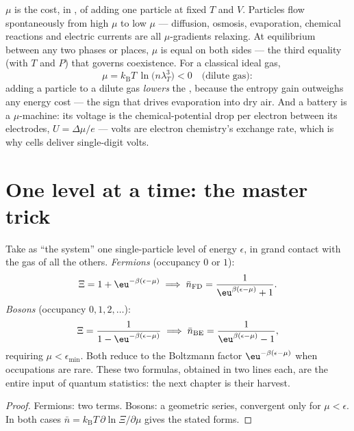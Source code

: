 \begin{definition}\label{def:b3:grand-canonical:mu}
$\mu$ is the cost, in , of adding one particle at fixed
$T$ and $V$. Particles flow spontaneously from high $\mu$ to low
$\mu$ --- diffusion, osmosis, evaporation, chemical reactions and
electric currents are all $\mu$-gradients relaxing. At equilibrium
between any two phases or places, $\mu$ is equal on both sides ---
the third equality (with $T$ and $P$) that governs coexistence. For
a classical ideal gas,
\[
\mu = k_{\text{B}}T\,\ln\!\big(n\lambda_T^3\big) < 0
\quad\text{(dilute gas)} :
\]
adding a particle to a dilute gas \emph{lowers} the ,
because the entropy gain outweighs any energy cost --- the sign that
drives evaporation into dry air. And a battery is a $\mu$-machine:
its voltage is the chemical-potential drop per electron between its
electrodes, $U = \Delta\mu/e$ --- volts are electron chemistry's
exchange rate, which is why cells deliver single-digit volts.
\end{definition}

\section{One level at a time: the master trick}

\begin{theorem}\label{thm:b3:grand-canonical:occupation}
Take as ``the system'' one single-particle level of energy
$\epsilon$, in grand contact with the gas of all the others.
\emph{Fermions} (occupancy $0$ or $1$):
\[
\Xi = 1 + \eu^{-\beta(\epsilon - \mu)}
\;\Longrightarrow\;
\bar n_{\text{FD}} = \frac{1}{\eu^{\beta(\epsilon - \mu)} + 1} .
\]
\emph{Bosons} (occupancy $0, 1, 2, \dots$):
\[
\Xi = \frac{1}{1 - \eu^{-\beta(\epsilon - \mu)}}
\;\Longrightarrow\;
\bar n_{\text{BE}} = \frac{1}{\eu^{\beta(\epsilon - \mu)} - 1} ,
\]
requiring $\mu < \epsilon_{\min}$. Both reduce to the Boltzmann
factor $\eu^{-\beta(\epsilon - \mu)}$ when occupations are rare.
These two formulas, obtained in two lines each, are the entire
input of quantum statistics: the next chapter is their harvest.
\end{theorem}

\begin{proof}
Fermions: two terms. Bosons: a geometric series, convergent only
for $\mu < \epsilon$. In both cases $\bar n = k_{\text{B}}T\,
\partial\ln\Xi/\partial\mu$ gives the stated forms.
\end{proof}

